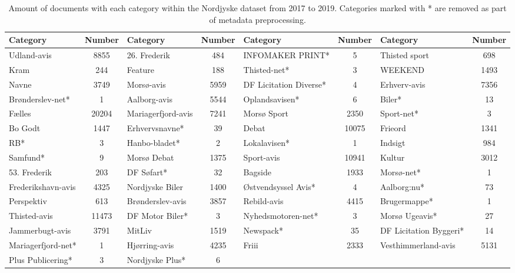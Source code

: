 \begin{table}[h]
	\centering
	\begin{tabular}{l|c|l|c|l|c|l|c}
		Category & Number & Category & Number & Category & Number & Category & Number \\
 		\toprule
		Udland-avis & 8855 & 26. Frederik & 484 & INFOMAKER PRINT* & 5 & Thisted sport & 698\\
		Kram & 244 & Feature & 188 & Thisted-net* & 3 & WEEKEND & 1493\\
		Navne & 3749 & Morsø-avis & 5959 & DF Licitation Diverse* & 4 & Erhverv-avis & 7356\\
		Brønderslev-net* & 1 & Aalborg-avis & 5544 & Oplandsavisen* & 6 & Biler* & 13\\
		Fælles & 20204 & Mariagerfjord-avis & 7241 & Morsø Sport & 2350 & Sport-net* & 3\\
		Bo Godt & 1447 & Erhvervsnavne* & 39 & Debat & 10075 & Frieord & 1341\\
		RB* & 3 & Hanbo-bladet* & 2 & Lokalavisen* & 1 & Indsigt & 984\\
		Samfund* & 9 & Morsø Debat & 1375 & Sport-avis & 10941 & Kultur & 3012 \\
		53. Frederik & 203 & DF Søfart* & 32 & Bagside & 1933 & Morsø-net* & 1 \\
		Frederikshavn-avis & 4325 & Nordjyske Biler & 1400 & Østvendsyssel Avis* & 4 & Aalborg:nu* & 73\\
		Perspektiv & 613 & Brønderslev-avis & 3857 & Rebild-avis & 4415 & Brugermappe* & 1\\
		Thisted-avis & 11473 & DF Motor Biler* & 3 & Nyhedsmotoren-net* & 3 & Morsø Ugeavis* & 27\\
		Jammerbugt-avis & 3791 & MitLiv & 1519 & Newspack* & 35 & DF Licitation Byggeri* & 14\\
		Mariagerfjord-net* & 1 & Hjørring-avis & 4235 & Friii & 2333 & Vesthimmerland-avis & 5131\\
		Plus Publicering* & 3 & Nordjyske Plus* & 6 & & & & \\
		\bottomrule
	\end{tabular}
	\caption{Amount of documents with each category within the Nordjyske dataset from 2017 to 2019. Categories marked with * are removed as part of metadata preprocessing.}
	\label{tab:category_table}
\end{table}


